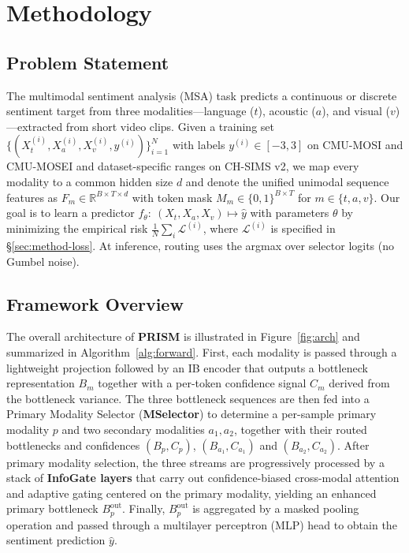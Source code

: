 \section{Methodology}
\label{sec:methodology}

\subsection{Problem Statement}
\label{sec:method-prob}
The multimodal sentiment analysis (MSA) task predicts a continuous or discrete
sentiment target from three modalities---language ($t$), acoustic ($a$), and
visual ($v$)---extracted from short video clips.
Given a training set $\{(X^{(i)}_t,X^{(i)}_a,X^{(i)}_v,y^{(i)})\}_{i=1}^{N}$
with labels $y^{(i)}\in[-3,3]$ on CMU-MOSI and CMU-MOSEI and dataset-specific
ranges on CH-SIMS v2, we map every modality to a common hidden size $d$ and
denote the unified unimodal sequence features as
$F_m \in \mathbb{R}^{B \times T \times d}$ with token mask
$M_m \in \{0,1\}^{B \times T}$ for $m \in \{t, a, v\}$.
Our goal is to learn a predictor
$f_{\theta}:\ (X_t, X_a, X_v) \mapsto \hat{y}$ with parameters $\theta$ by
minimizing the empirical risk $\tfrac{1}{N}\sum_i \mathcal{L}^{(i)}$, where
$\mathcal{L}^{(i)}$ is specified in \S\ref{sec:method-loss}.
At inference, routing uses the argmax over selector logits (no Gumbel noise).

\subsection{Framework Overview}
\label{sec:method-overview}
The overall architecture of \textbf{PRISM} is illustrated in
Figure~\ref{fig:arch} and summarized in Algorithm~\ref{alg:forward}.
First, each modality is passed through a lightweight projection followed by
an IB encoder that outputs a bottleneck representation $B_m$ together with a
per-token confidence signal $C_m$ derived from the bottleneck variance.
The three bottleneck sequences are then fed into a Primary Modality Selector
(\textbf{MSelector}) to determine a per-sample primary modality $p$ and two
secondary modalities $a_1,a_2$, together with their routed bottlenecks and
confidences $(B_p, C_p)$, $(B_{a_1}, C_{a_1})$ and $(B_{a_2}, C_{a_2})$.
After primary modality selection, the three streams are progressively processed
by a stack of \textbf{InfoGate layers} that carry out confidence-biased
cross-modal attention and adaptive gating centered on the primary modality,
yielding an enhanced primary bottleneck $B_p^{\mathrm{out}}$.
Finally, $B_p^{\mathrm{out}}$ is aggregated by a masked pooling operation and
passed through a multilayer perceptron (MLP) head to obtain the sentiment
prediction $\hat{y}$.


